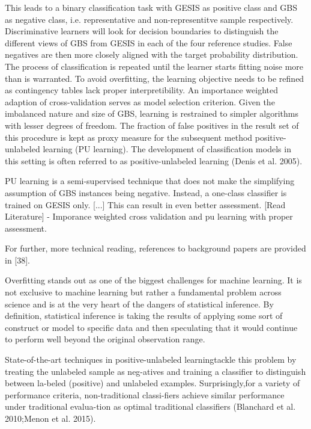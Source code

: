 
This leads to a binary classification task with GESIS as positive class and GBS as negative class, i.e. representative and non-representitve sample respectively. Discriminative learners will look for decision boundaries to distinguish the different views of GBS from GESIS in each of the four reference studies. False negatives are then more closely aligned with the target probability distribution. The process of classification is repeated until the learner starts fitting noise more than is warranted. To avoid overfitting, the learning objective needs to be refined as contingency tables lack proper interpretibility. An importance weighted adaption of cross-validation serves as model selection criterion. Given the imbalanced nature and size of GBS, learning is restrained to simpler algorithms with lesser degrees of freedom. The fraction of false positives in the result set of this procedure is kept as proxy measure for the subsequent method positive-unlabeled learning (PU learning). The development of classiﬁcation models in this setting is often referred to as positive-unlabeled learning (Denis et al. 2005).



PU learning is a semi-supervised technique that does not make the simplifying assumption of GBS instances being negative. Instead, a one-class classifier is trained on GESIS only. [...] This can result in even better assessment. [Read Literature] - Imporance weighted cross validation and pu learning with proper assessment.

%

For further, more technical reading, references to background papers are provided in [38].

Overﬁtting stands out as one of the biggest challenges for machine learning. It is not exclusive to machine learning but rather a fundamental problem across science and is at the very heart of the dangers of statistical inference. By deﬁnition, statistical inference is taking the results of applying some sort of construct or model to speciﬁc data and then speculating that it would continue to perform well beyond the original observation range.

State-of-the-art techniques in positive-unlabeled learningtackle this problem by treating the unlabeled sample as neg-atives and training a classiﬁer to distinguish between la-beled (positive) and unlabeled examples. 
Surprisingly,for a variety of performance criteria, non-traditional classi-ﬁers achieve similar performance under traditional evalua-tion as optimal traditional classiﬁers (Blanchard et al. 2010;Menon et al. 2015). 

